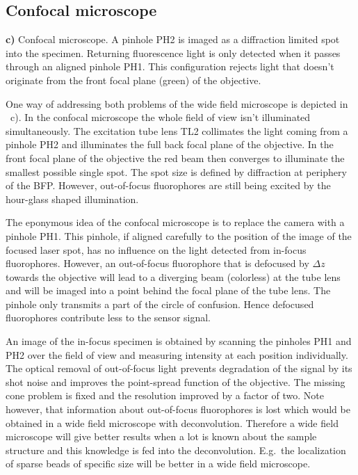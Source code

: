 \subsection{Confocal microscope}


{\bf c)} Confocal
    microscope. A pinhole PH2 is imaged as a diffraction limited spot
    into the specimen. Returning fluorescence light is only detected
    when it passes through an aligned pinhole PH1. This configuration
    rejects light that doesn't originate from the front focal plane
    (green) of the objective.

One way of addressing both problems of the wide field microscope is
depicted in ~c). In the confocal
microscope the whole field of view isn't illuminated simultaneously.
The excitation tube lens TL2 collimates the light coming from a
pinhole PH2 and illuminates the full back focal plane of the
objective. In the front focal plane of the objective the red beam then
converges to illuminate the smallest possible single spot. The spot
size is defined by diffraction at periphery of the BFP. However,
out-of-focus fluorophores are still being excited by the hour-glass
shaped illumination.

The eponymous idea of the confocal microscope is to replace the camera
with a pinhole PH1. This pinhole, if aligned carefully to the position
of the image of the focused laser spot, has no influence on the light
detected from in-focus fluorophores. However, an out-of-focus
fluorophore that is defocused by $\Delta z$ towards the objective will
lead to a diverging beam (colorless) at the tube lens and will be
imaged into a point behind the focal plane of the tube lens. The
pinhole only transmits a part of the circle of confusion. Hence
defocused fluorophores contribute less to the sensor signal.

An image of the in-focus specimen is obtained by scanning the pinholes
PH1 and PH2 over the field of view and measuring intensity at each
position individually. The optical removal of out-of-focus light
prevents degradation of the signal by its shot noise and improves the
point-spread function of the objective. The missing cone problem is
fixed and the resolution improved by a factor of two. Note however,
that information about out-of-focus fluorophores is lost which would
be obtained in a wide field microscope with deconvolution. Therefore a
wide field microscope will give better results when a lot is known
about the sample structure and this knowledge is fed into the
deconvolution. E.g.\ the localization of sparse beads of specific size
will be better in a wide field microscope.

